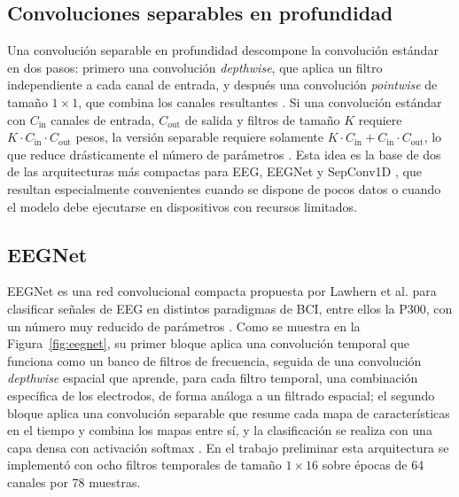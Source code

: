 \subsection{Convoluciones separables en profundidad}

Una convolución separable en profundidad descompone la convolución estándar en dos pasos: primero
una convolución \textit{depthwise}, que aplica un filtro independiente a cada canal de entrada, y
después una convolución \textit{pointwise} de tamaño $1\times1$, que combina los canales
resultantes \cite{chollet2017}. Si una convolución estándar con $C_{\text{in}}$ canales de entrada,
$C_{\text{out}}$ de salida y filtros de tamaño $K$ requiere $K\cdot C_{\text{in}}\cdot
C_{\text{out}}$ pesos, la versión separable requiere solamente $K\cdot C_{\text{in}} +
C_{\text{in}}\cdot C_{\text{out}}$, lo que reduce drásticamente el número de parámetros
\cite{chollet2017}. Esta idea es la base de dos de las arquitecturas más compactas para EEG,
EEGNet \cite{lawhern2018} y SepConv1D \cite{alvarado2021}, que resultan especialmente convenientes
cuando se dispone de pocos datos o cuando el modelo debe ejecutarse en dispositivos con recursos
limitados.

\subsection{EEGNet}

EEGNet es una red convolucional compacta propuesta por Lawhern et al. para clasificar señales de
EEG en distintos paradigmas de BCI, entre ellos la P300, con un número muy reducido de parámetros
\cite{lawhern2018}. Como se muestra en la Figura~\ref{fig:eegnet}, su primer bloque aplica una
convolución temporal que funciona como un banco de filtros de frecuencia, seguida de una
convolución \textit{depthwise} espacial que aprende, para cada filtro temporal, una combinación
específica de los electrodos, de forma análoga a un filtrado espacial; el segundo bloque aplica
una convolución separable que resume cada mapa de características en el tiempo y combina los
mapas entre sí, y la clasificación se realiza con una capa densa con activación softmax
\cite{lawhern2018}. En el trabajo preliminar esta arquitectura se implementó con ocho filtros
temporales de tamaño $1\times16$ sobre épocas de 64 canales por 78 muestras.

